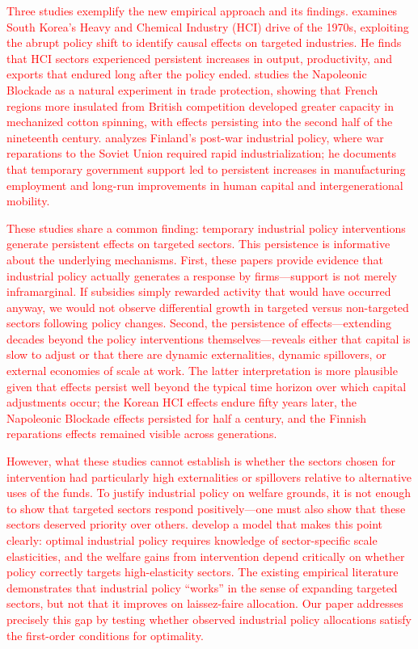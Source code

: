 \documentclass{article}
\begin{document}
\textcolor{red}{Three studies exemplify the new empirical approach and its findings. \citet{lane2025manufacturing} examines South Korea's Heavy and Chemical Industry (HCI) drive of the 1970s, exploiting the abrupt policy shift to identify causal effects on targeted industries. He finds that HCI sectors experienced persistent increases in output, productivity, and exports that endured long after the policy ended. \citet{juhasz2018temporary} studies the Napoleonic Blockade as a natural experiment in trade protection, showing that French regions more insulated from British competition developed greater capacity in mechanized cotton spinning, with effects persisting into the second half of the nineteenth century. \citet{mitrunen2024war} analyzes Finland's post-war industrial policy, where war reparations to the Soviet Union required rapid industrialization; he documents that temporary government support led to persistent increases in manufacturing employment and long-run improvements in human capital and intergenerational mobility.}

\textcolor{red}{These studies share a common finding: temporary industrial policy interventions generate persistent effects on targeted sectors. This persistence is informative about the underlying mechanisms. First, these papers provide evidence that industrial policy actually generates a response by firms---support is not merely inframarginal. If subsidies simply rewarded activity that would have occurred anyway, we would not observe differential growth in targeted versus non-targeted sectors following policy changes. Second, the persistence of effects---extending decades beyond the policy interventions themselves---reveals either that capital is slow to adjust or that there are dynamic externalities, dynamic spillovers, or external economies of scale at work. The latter interpretation is more plausible given that effects persist well beyond the typical time horizon over which capital adjustments occur; the Korean HCI effects endure fifty years later, the Napoleonic Blockade effects persisted for half a century, and the Finnish reparations effects remained visible across generations.}

\textcolor{red}{However, what these studies cannot establish is whether the sectors chosen for intervention had particularly high externalities or spillovers relative to alternative uses of the funds. To justify industrial policy on welfare grounds, it is not enough to show that targeted sectors respond positively---one must also show that these sectors deserved priority over others. \citet{bartelme2025textbook} develop a model that makes this point clearly: optimal industrial policy requires knowledge of sector-specific scale elasticities, and the welfare gains from intervention depend critically on whether policy correctly targets high-elasticity sectors. The existing empirical literature demonstrates that industrial policy ``works'' in the sense of expanding targeted sectors, but not that it improves on laissez-faire allocation. Our paper addresses precisely this gap by testing whether observed industrial policy allocations satisfy the first-order conditions for optimality.}
\end{document}
